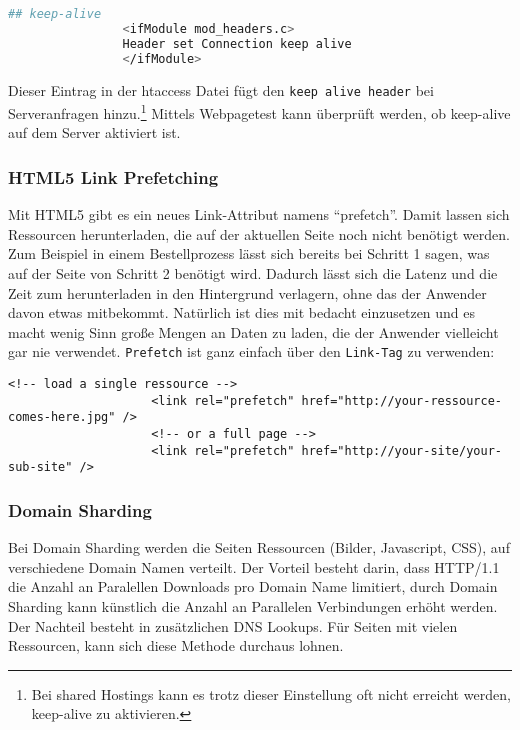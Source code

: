 			\begin{lstlisting}[captionpos=b, caption=htaccess Eintrag nach \autocite{sextonAlive}, label=lst:keepAlive, language=bash]
				## keep-alive
				<ifModule mod_headers.c> 
				Header set Connection keep alive
				</ifModule>
			\end{lstlisting}
				
			Dieser Eintrag in der htaccess Datei fügt den \texttt{keep alive header} bei Serveranfragen hinzu.\footnote{Bei shared Hostings kann es trotz dieser Einstellung oft nicht erreicht werden, keep-alive zu aktivieren.} Mittels Webpagetest kann überprüft werden, ob keep-alive auf dem Server aktiviert ist.

			\subsubsection{HTML5 Link Prefetching} %
			\label{ssub:html5_link_prefetching}
				Mit HTML5 gibt es ein neues Link-Attribut namens "`prefetch"'. Damit lassen sich Ressourcen herunterladen, die auf der aktuellen Seite noch nicht benötigt werden. Zum Beispiel in einem Bestellprozess lässt sich bereits bei Schritt 1 sagen, was auf der Seite von Schritt 2 benötigt wird. Dadurch lässt sich die Latenz und die Zeit zum herunterladen in den Hintergrund verlagern, ohne das der Anwender davon etwas mitbekommt. Natürlich ist dies mit bedacht einzusetzen und es macht wenig Sinn große Mengen an Daten zu laden, die der Anwender vielleicht gar nie verwendet. \texttt{Prefetch} ist ganz einfach über den \texttt{Link-Tag} zu verwenden:
				\begin{lstlisting}[captionpos=b, caption=Prefetching via Link-Tag, label=lst:prefetch]
					<!-- load a single ressource -->
					<link rel="prefetch" href="http://your-ressource-comes-here.jpg" />
					<!-- or a full page -->
					<link rel="prefetch" href="http://your-site/your-sub-site" />
				\end{lstlisting}
				
			

			\subsubsection{Domain Sharding} %
			\label{ssub:domain_sharding}
				Bei Domain Sharding werden die Seiten Ressourcen (Bilder, Javascript, CSS), auf verschiedene Domain Namen verteilt. Der Vorteil besteht darin, dass HTTP/1.1 die Anzahl an Paralellen Downloads pro Domain Name limitiert, durch Domain Sharding kann künstlich die Anzahl an Parallelen Verbindungen erhöht werden. Der Nachteil besteht in zusätzlichen DNS Lookups. Für Seiten mit vielen Ressourcen, kann sich diese Methode durchaus lohnen.
			\pagebreak

